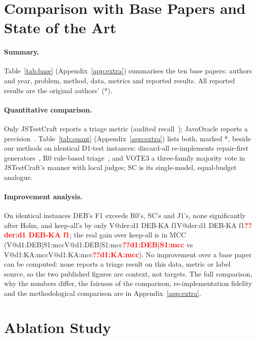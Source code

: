 \documentclass[pdflatex,iicol,sn-mathphys-num]{sn-jnl}
\makeatletter
\newcommand{\V}[1]{\ifcsname V@#1\endcsname\csname V@#1\endcsname\else\textbf{\textcolor{red}{??#1}}\fi}
\makeatother
\begin{document}
\section{Comparison with Base Papers and State of the Art}\label{sec:comparison}

\paragraph{Summary.} Table~\ref{tab:base} (Appendix~\ref{app:extra}) summarises the ten base papers: authors and year, problem, method, data, metrics and reported results. All reported results are the original authors' (*).


\paragraph{Quantitative comparison.} Only JSTestCraft reports a triage metric (audited recall~\cite{liu2026jstestcraft}); JavaOracle reports a precision~\cite{fu2026javaoracle}. Table~\ref{tab:quant} (Appendix~\ref{app:extra}) lists both, marked *, beside our methods on identical D1-test instances: discard-all re-implements repair-first generators~\cite{gu2026testart,hayet2025chatassert}, R0 rule-based triage~\cite{maddila2026agentic,herzig2015alarms}, and VOTE3 a three-family majority vote in JSTestCraft's manner with local judges; SC is its single-model, equal-budget analogue.


\paragraph{Improvement analysis.} On identical instances DEB's F1 exceeds R0's, SC's and J1's, none significantly after Holm, and keep-all's by only \V{der:d1 DEB-KA f1}; the real gain over keep-all is in MCC (\V{d1:DEB|S1:mcc} vs \V{d1:KA:mcc}). No improvement over a base paper can be computed: none reports a triage result on this data, metric or label source, so the two published figures are context, not targets. The full comparison, why the numbers differ, the fairness of the comparison, re-implementation fidelity and the methodological comparison are in Appendix~\ref{app:extra}.

\section{Ablation Study}\label{sec:ablation}
\end{document}
